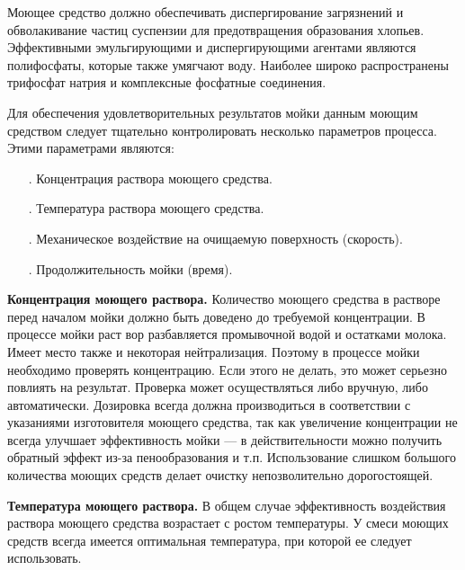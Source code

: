 {\par \redline Моющее средство должно обеспечивать диспергирование загрязнений и обволакивание частиц суспензии для предотвращения образования хлопьев. Эффективными эмульгирующими и диспергирующими агентами являются полифосфаты, которые также умягчают воду. Наиболее широко распространены трифосфат натрия и комплексные фосфатные соединения.

\par \redline Для обеспечения удовлетворительных результатов мойки данным моющим средством следует тщательно контролировать несколько параметров процесса. Этими параметрами являются:

\begin{itemize}[leftmargin=2.15cm, labelwidth=0.65cm, labelsep=0.0cm] 
	
	\item[\theitemcntr. ] Концентрация раствора моющего средства.
	\addtocounter{itemcntr}{1}
	
	\item[\theitemcntr. ] Температура раствора моющего средства.
	\addtocounter{itemcntr}{1}
	
	\item[\theitemcntr. ] Механическое воздействие на очищаемую поверхность (скорость).
	\addtocounter{itemcntr}{1}
	
	\item[\theitemcntr. ] Продолжительность мойки (время).
	\addtocounter{itemcntr}{1}
	
	\setcounter{itemcntr}{1}
\end{itemize}

\par \redline \textbf{Концентрация моющего раствора.} Количество моющего средства в растворе перед началом мойки должно быть доведено до требуемой концентрации. В процессе мойки раст вор разбавляется промывочной водой и остатками молока. Имеет место также и некоторая нейтрализация. Поэтому в процессе мойки необходимо проверять концентрацию. Если этого не делать, это может серьезно повлиять на результат. Проверка может осуществляться либо вручную, либо автоматически. Дозировка всегда должна производиться в соответствии с указаниями изготовителя моющего средства, так как увеличение концентрации не всегда улучшает эффективность мойки — в действительности можно получить обратный эффект из-за пенообразования и т.п. Использование слишком большого количества моющих средств делает очистку непозволительно дорогостоящей.

\par \redline \textbf{Температура моющего раствора.} В общем случае эффективность воздействия раствора моющего средства возрастает с ростом температуры. У смеси моющих средств всегда имеется оптимальная температура, при которой ее следует использовать.

}
